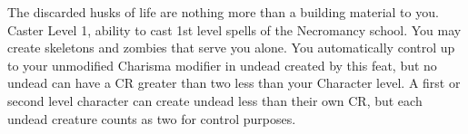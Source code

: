 \descfeat
{The discarded husks of life are nothing more than a building material to you.}
{Caster Level 1, ability to cast 1st level spells of the Necromancy school.}
{You may create skeletons and zombies that serve you alone.  You automatically control up to your unmodified Charisma modifier in undead created by this feat, but no undead can have a CR greater than two less than your Character level.}
{A first or second level character can create undead less than their own CR, but each undead creature counts as two for control purposes.}

